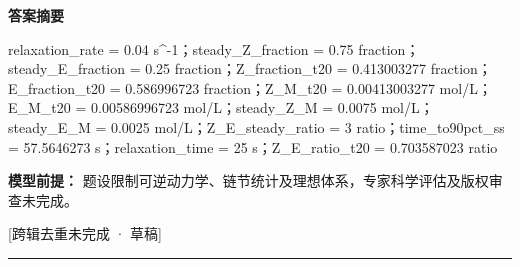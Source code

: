 \documentclass[UTF8,11pt,a4paper]{ctexart}
\begin{document}
\noindent\textbf{答案摘要}\par
relaxation\_rate = 0.04 s\textasciicircum{}-1；steady\_Z\_fraction = 0.75 fraction；steady\_E\_fraction = 0.25 fraction；Z\_fraction\_t20 = 0.413003277 fraction；E\_fraction\_t20 = 0.586996723 fraction；Z\_M\_t20 = 0.00413003277 mol/L；E\_M\_t20 = 0.00586996723 mol/L；steady\_Z\_M = 0.0075 mol/L；steady\_E\_M = 0.0025 mol/L；Z\_E\_steady\_ratio = 3 ratio；time\_to90pct\_ss = 57.5646273 s；relaxation\_time = 25 s；Z\_E\_ratio\_t20 = 0.703587023 ratio\par
\noindent\textbf{模型前提：}
题设限制可逆动力学、链节统计及理想体系，专家科学评估及版权审查未完成。\par
\noindent\textcolor{red!65!black}{[跨辑去重未完成 · 草稿]} \par
\medskip\hrule\medskip
{}
\end{document}

